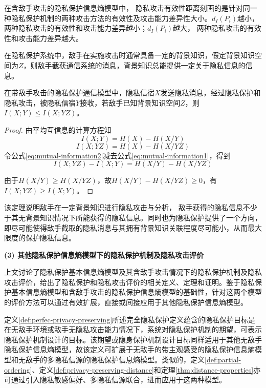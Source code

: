 在含敌手攻击的隐私保护信息熵模型中， 隐私攻击有效性距离刻画的是针对同一种隐私保护机制的两种攻击方法的有效性及攻击能力差异性大小。$d_{I}(P_{i})$越小，两种隐私攻击的有效性和攻击能力差异越小；$d_{I}(P_{i})$越大， 两种隐私攻击的有效性和攻击能力差异越大。

在隐私保护系统中，敌手在实施攻击时通常具备一定的背景知识，假定背景知识空间为$Z$，则敌手截获通信系统的消息，背景知识总能提供一定关于隐私信息的信息。

\begin{theorem}
	\label{thm:privacy-attack-performance}
	在带敌手攻击的隐私保护通信模型中，隐私信宿$X$发送隐私消息，经过隐私保护和隐私攻击，被隐私信宿$Y$接收，若敌手已知背景知识空间$Z$，则$I(X;Y)\leqslant I(X;YZ)$。
\end{theorem} 

\begin{proof}
由平均互信息的计算方程知
\begin{equation}
\label{eq:mutual-information1}
I(X;Y) =H(X)-H(X/Y)
\end{equation}
\begin{equation}
\label{eq:mutual-information2}
I(X;YZ) =H(X)-H(X/YZ)
\end{equation}
令公式\ref{eq:mutual-information2}减去公式\ref{eq:mutual-information1}，得到
\begin{equation}
I(X;YZ)-I(X;Y) =H(X/Y)-H(X/YZ)
\end{equation}

由于$H(X/Y) \geqslant H(X/YZ)$，故$H(X/Y)- H(X/YZ)\geqslant0$，有$I(X;YZ)\geqslant I(X;Y)$。
\end{proof}

该定理说明敌手在一定背景知识进行隐私攻击与分析， 敌手获得的隐私信息不少于其无背景知识情况下所能获得的隐私信息。同时也为隐私保护提供了一个方向，即尽可能使得敌手截取的隐私消息与其拥有背景知识关联程度尽可能小，从而最大限度的保护隐私信息。

\textbf{(3) 其他隐私保护信息熵模型下的隐私保护机制及隐私攻击评价}

上文讨论了隐私保护基本信息熵模型及其含敌手攻击情况下的隐私保护机制及隐私攻击评价，给出了隐私保护和隐私攻击评价的相关定义、定理和证明。鉴于隐私保护基本信息熵模型和含敌手攻击的隐私保护信息熵模型的基础性，针对这两个模型的评价方法可以通过有效扩展，直接或间接应用于其他隐私保护信息熵模型。

定义\ref{def:perfec-privacy-preserving}所述完全隐私保护定义蕴含的隐私保护目标是在无敌手环境或敌手无隐私攻击能力情况下，系统对隐私保护机制的期望，可表示隐私保护机制设计的目标。该期望或隐身保护机制设计目标同样适用于其他无敌手隐私保护信息熵模型，故该定义可扩展于无敌手的带主观感受的隐私保护信息熵模型和无敌手的多隐私信源的隐私保护信息熵模型。类似的，定义\ref{def:partial-ordering}、定义\ref{def:privacy-preserving-distance}和定理\ref{thm:distance-properties}亦可通过引入隐私敏感偏好、多隐私信源联合，进而应用于这两种模型。

